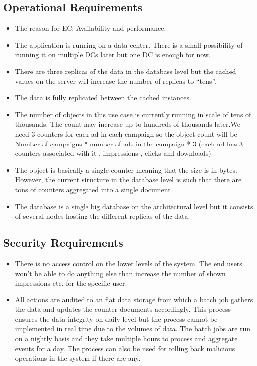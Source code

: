 \documentclass[11pt,a4paper]{report}
\begin{document}
\subsection{Operational Requirements}
\begin{itemize}
\item The reason for EC: Availability and performance.
\item The application is running on a data center. There is a small possibility of running it on multiple DCs later but one DC is enough for now.
\item There are three replicas of the data in the database level but the cached values on the server will increase the number of replicas to ``tens''.
\item The data is fully replicated between the cached instances.
\item The number of objects in this use case is currently running in scale of tens of thousands. The count may increase up to hundreds of thousands later.We need 3 counters for each ad in each campaign so the object count will be Number of campaigns * number of ads in the campaign * 3 (each ad has 3 counters associated with it , impressions , clicks and downloads)
\item The object is basically a single counter meaning that the size is in bytes. However, the current structure in the database level is such that there are tons of counters aggregated into a single document.
\item The database is a single big database on the architectural level but it consists of several nodes hosting the different replicas of the data.
\end{itemize}

\subsection{Security Requirements}
\begin{itemize}
\item There is no access control on the lower levels of the system. The end users won't be able to do anything else than increase the number of shown impressions etc. for the specific user.
\item All actions are audited to an flat data storage from which a batch job gathers the data and updates the counter documents accordingly. This process ensures the data integrity on daily level but the process cannot be implemented in real time due to the volumes of data. The batch jobs are run on a nightly basis and they take multiple hours to process and aggregate events for a day.  The process can also be used for rolling back malicious operations in the system if there are any.
\end{itemize}
\end{document}
